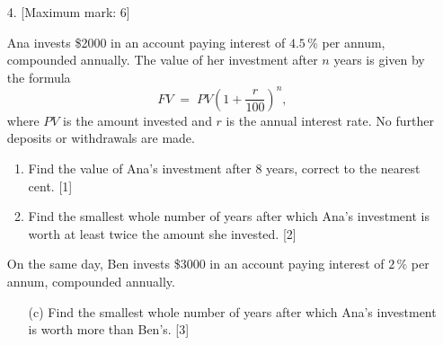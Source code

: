\documentclass[12pt, twoside]{article}
\begin{document}
\begin{enumerate}[itemsep=0.15cm]

\newpage

\item[4.] [Maximum mark: 6]

Ana invests \$2000 in an account paying interest of $4.5\,\%$ per
annum, compounded annually. The value of her investment after $n$
years is given by the formula
$$\mathit{FV} \;=\; \mathit{PV} \left(1 + \dfrac{r}{100}\right)^{\!n},$$
where $\mathit{PV}$ is the amount invested and $r$ is the annual interest rate.
No further deposits or withdrawals are made.

\begin{enumerate}[itemsep=0.1cm]
  \item Find the value of Ana's investment after $8$ years, correct to
  the nearest cent. \hfill [1]
  \item Find the smallest whole number of years after which Ana's
  investment is worth at least twice the amount she invested.
  \hfill [2]
\end{enumerate}

On the same day, Ben invests \$3000 in an account paying interest of
$2\,\%$ per annum, compounded annually.

\begin{enumerate}[itemsep=0.1cm]
  \item[(c)] Find the smallest whole number of years after which Ana's
  investment is worth more than Ben's. \hfill [3]
\end{enumerate}


\end{enumerate}
\end{document}
